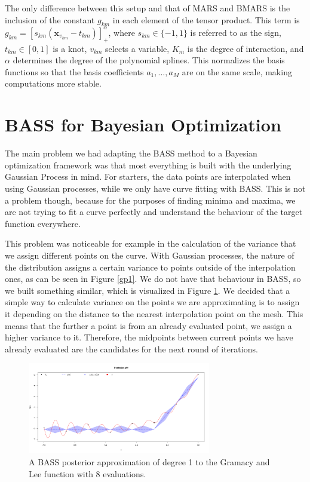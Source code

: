 \documentclass[%
 aip,
 amsmath,amssymb,
 reprint,%
]{revtex4-1}
\begin{document}
The only difference between this setup and that of MARS and BMARS is the inclusion of the constant $g_{km}$ in each element of the tensor product. This term is $g_{km}=[s_{km}(\boldsymbol{x}_{v_{km}} - t_{km}) ]^\alpha_+$, where $s_{km} \in \{-1,1\}$ is referred to as the sign, $t_{km}\in [0,1]$ is a knot, $v_{km}$ selects a variable, $K_m$ is the degree of interaction, and $\alpha$ determines the degree of the polynomial splines. This normalizes the basis functions so that the basis coefficients $a_1, \ldots, a_M$ are on the same scale, making computations more stable.

\section{BASS for Bayesian Optimization}

The main problem we had adapting the BASS method to a Bayesian optimization framework was that most everything is built with the underlying Gaussian Process in mind. For starters, the data points are interpolated when using Gaussian processes, while we only have curve fitting with BASS. This is not a problem though, because for the purposes of finding minima and maxima, we are not trying to fit a curve perfectly and understand the behaviour of the target function everywhere. 

This problem was noticeable for example in the calculation of the variance that we assign different points on the curve. With Gaussian processes, the nature of the distribution assigns a certain variance to points outside of the interpolation ones, as can be seen in Figure \ref{gp1}. We do not have that behaviour in BASS, so we built something similar, which is visualized in Figure \ref{gram8}. We decided that a simple way to calculate variance on the points we are approximating is to assign it depending on the distance to the nearest interpolation point on the mesh. This means that the further a point is from an already evaluated point, we assign a higher variance to it. Therefore, the midpoints between current points we have already evaluated are the candidates for the next round of iterations. 

\begin{figure}
	\centering
	\includegraphics[width=8cm]{Figures/BASS8.png}
	\caption{A BASS posterior approximation of degree 1 to the Gramacy and Lee function \cite{gramacy2012cases} with 8 evaluations.}
	\label{gram8}
\end{figure}
\end{document}
